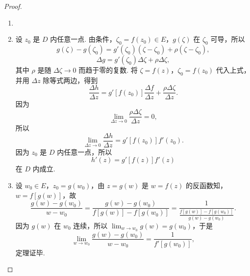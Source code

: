 \documentclass[../../main.tex]{subfiles}
\begin{document}
\begin{proof}
\begin{enumerate}[(1)]
\item 

\item 设 \( z_0 \) 是 \( D \) 内任意一点. 由条件，\( \zeta_0 = f(z_0) \in E \)，\( g(\zeta) \) 在 \( \zeta_0 \) 可导，所以
\[
g(\zeta) - g(\zeta_0) = g'(\zeta_0)(\zeta - \zeta_0) + \rho(\zeta - \zeta_0),
\]
\[
\Delta g = g'(\zeta_0)\Delta \zeta + \rho \Delta \zeta,
\]
其中 \( \rho \) 是随 \( \Delta \zeta \to 0 \) 而趋于零的复数. 将 \( \zeta = f(z) \)，\( \zeta_0 = f(z_0) \) 代入上式，并用 \( \Delta z \) 除等式两边，得到
\[
\frac{\Delta h}{\Delta z} = g'[f(z_0)] \frac{\Delta f}{\Delta z} + \frac{\rho \Delta \zeta}{\Delta z}.
\]
因为
\[
\lim_{\Delta z \to 0} \frac{\rho \Delta \zeta}{\Delta z} = 0,
\]
所以
\[
\lim_{\Delta z \to 0} \frac{\Delta h}{\Delta z} = g'[f(z_0)]f'(z_0).
\]
因为 \( z_0 \) 是 \( D \) 内任意一点，所以
\[
h'(z) = g'[f(z)]f'(z)
\]
在 \( D \) 内成立.

\item 设 \( w_0 \in E \)，\( z_0 = g(w_0) \)，由 \( z = g(w) \) 是 \( w = f(z) \) 的反函数知，\( w = f[g(w)] \)，故
\[
\frac{g(w) - g(w_0)}{w - w_0} = \frac{g(w) - g(w_0)}{f[g(w)] - f[g(w_0)]} = \frac{1}{\frac{f[g(w)] - f[g(w_0)]}{g(w) - g(w_0)}}.
\]
因为 \( g(w) \) 在 \( w_0 \) 连续，所以 \( \lim_{w \to w_0} g(w) = g(w_0) \)，于是
\[
\lim_{w \to w_0} \frac{g(w) - g(w_0)}{w - w_0} = \frac{1}{f'[g(w_0)]},
\]
定理证毕.
\end{enumerate}
\end{proof}
\end{document}
